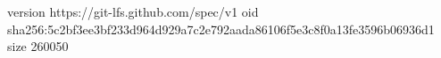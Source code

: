version https://git-lfs.github.com/spec/v1
oid sha256:5c2bf3ee3bf233d964d929a7c2e792aada86106f5e3c8f0a13fe3596b06936d1
size 260050

